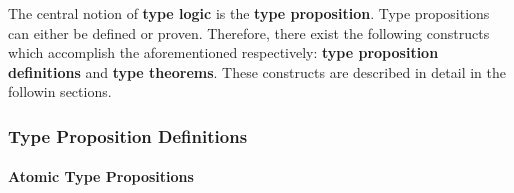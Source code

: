 \documentclass{article}
\begin{document}
The central notion of \textbf{type logic} is the \textbf{type proposition}.
Type propositions can either be defined or proven. Therefore, there exist the
following constructs which accomplish the aforementioned respectively:
\textbf{type proposition definitions} and \textbf{type theorems}. These constructs
are described in detail in the followin sections.

\subsubsection{Type Proposition Definitions}

\paragraph{Atomic Type Propositions}
\end{document}

